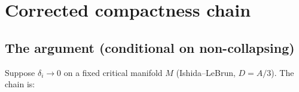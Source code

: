 %
%

\section{Corrected compactness chain}

\subsection{The argument (conditional on non-collapsing)}

Suppose \(\delta_i\to0\) on a fixed critical manifold \(M\) (Ishida--LeBrun,
\(D=A/3\)).  The chain is:

